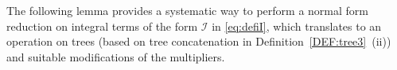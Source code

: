 \documentclass[%
11pt,  reqno]{amsart}
\newcommand{\5}{\textup{V}}
\newcommand{\ft}{\widehat}
\theoremstyle{remark}
\newcommand{\R}{\mathbb{R}}
\newcommand{\bul}{\bullet}
\newcommand{\TT}{\mathcal{T}}
\newcommand{\G}{\Gamma}
\newcommand{\B}{\mathcal{B}}
\newcommand{\Ical}{\mathcal{I}}
\numberwithin{equation}{section}
\numberwithin{theorem}{section}
\begin{document}



The following lemma provides a systematic way to perform a normal form reduction on integral terms of the form $\Ical$ in \eqref{eq:defiI}, which translates to an operation on trees (based on tree concatenation in Definition~\ref{DEF:tree3}~(ii)) and suitable modifications of the multipliers. 
\end{document}
